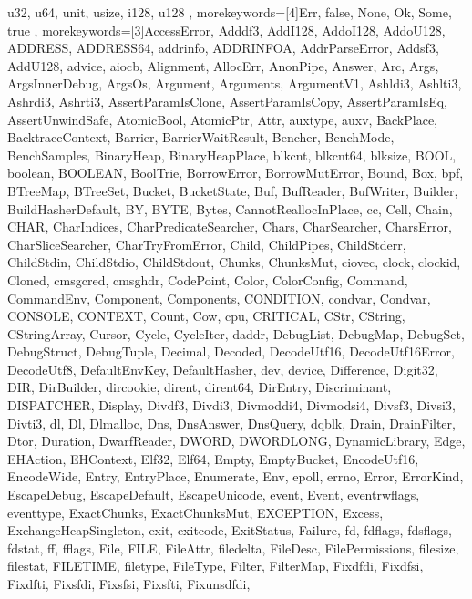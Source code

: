 {{u32, u64, unit, usize, i128, u128}  %
%
, morekeywords=[4]{Err, false, None, Ok, Some, true}  %
, morekeywords=[3]{AccessError, Adddf3, AddI128, AddoI128, AddoU128, ADDRESS,
ADDRESS64, addrinfo, ADDRINFOA, AddrParseError, Addsf3, AddU128, advice, aiocb,
Alignment, AllocErr, AnonPipe, Answer, Arc, Args, ArgsInnerDebug, ArgsOs,
Argument, Arguments, ArgumentV1, Ashldi3, Ashlti3, Ashrdi3, Ashrti3,
AssertParamIsClone, AssertParamIsCopy, AssertParamIsEq, AssertUnwindSafe,
AtomicBool, AtomicPtr, Attr, auxtype, auxv, BackPlace, BacktraceContext,
Barrier, BarrierWaitResult, Bencher, BenchMode, BenchSamples, BinaryHeap,
BinaryHeapPlace, blkcnt, blkcnt64, blksize, BOOL, boolean, BOOLEAN, BoolTrie,
BorrowError, BorrowMutError, Bound, Box, bpf, BTreeMap, BTreeSet, Bucket,
BucketState, Buf, BufReader, BufWriter, Builder, BuildHasherDefault, BY, BYTE,
Bytes, CannotReallocInPlace, cc, Cell, Chain, CHAR, CharIndices,
CharPredicateSearcher, Chars, CharSearcher, CharsError, CharSliceSearcher,
CharTryFromError, Child, ChildPipes, ChildStderr, ChildStdin, ChildStdio,
ChildStdout, Chunks, ChunksMut, ciovec, clock, clockid, Cloned, cmsgcred,
cmsghdr, CodePoint, Color, ColorConfig, Command, CommandEnv, Component,
Components, CONDITION, condvar, Condvar, CONSOLE, CONTEXT, Count, Cow, cpu,
CRITICAL, CStr, CString, CStringArray, Cursor, Cycle, CycleIter, daddr,
DebugList, DebugMap, DebugSet, DebugStruct, DebugTuple, Decimal, Decoded,
DecodeUtf16, DecodeUtf16Error, DecodeUtf8, DefaultEnvKey, DefaultHasher, dev,
device, Difference, Digit32, DIR, DirBuilder, dircookie, dirent, dirent64,
DirEntry, Discriminant, DISPATCHER, Display, Divdf3, Divdi3, Divmoddi4,
Divmodsi4, Divsf3, Divsi3, Divti3, dl, Dl, Dlmalloc, Dns, DnsAnswer, DnsQuery,
dqblk, Drain, DrainFilter, Dtor, Duration, DwarfReader, DWORD, DWORDLONG,
DynamicLibrary, Edge, EHAction, EHContext, Elf32, Elf64, Empty, EmptyBucket,
EncodeUtf16, EncodeWide, Entry, EntryPlace, Enumerate, Env, epoll, errno, Error,
ErrorKind, EscapeDebug, EscapeDefault, EscapeUnicode, event, Event,
eventrwflags, eventtype, ExactChunks, ExactChunksMut, EXCEPTION, Excess,
ExchangeHeapSingleton, exit, exitcode, ExitStatus, Failure, fd, fdflags,
fdsflags, fdstat, ff, fflags, File, FILE, FileAttr, filedelta, FileDesc,
FilePermissions, filesize, filestat, FILETIME, filetype, FileType, Filter,
FilterMap, Fixdfdi, Fixdfsi, Fixdfti, Fixsfdi, Fixsfsi, Fixsfti, Fixunsdfdi,
}}
